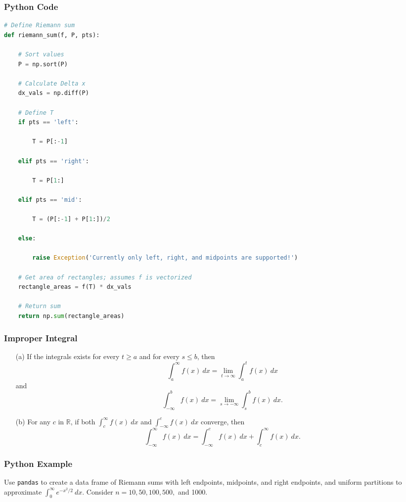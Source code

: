 \documentclass{beamer}
\begin{document}
\begin{frame}[fragile]
\frametitle{Python Code}

\begin{lstlisting}[language=Python]
# Define Riemann sum
def riemann_sum(f, P, pts):
    
    # Sort values
    P = np.sort(P)

    # Calculate Delta x
    dx_vals = np.diff(P) 

    # Define T
    if pts == 'left':

        T = P[:-1]

    elif pts == 'right':

        T = P[1:]

    elif pts == 'mid':
        
        T = (P[:-1] + P[1:])/2
        
    else:
        
        raise Exception('Currently only left, right, and midpoints are supported!')
        
    # Get area of rectangles; assumes f is vectorized
    rectangle_areas = f(T) * dx_vals
    
    # Return sum
    return np.sum(rectangle_areas)
\end{lstlisting}
\end{frame}

\begin{frame}
\frametitle{Improper Integral}
\begin{Definition}
{
\linespread{0.5}
\begin{enumerate}
\item[(a)] If the integrals exists for every $t \geq a$ and for every $s \leq b$, then
$$
\int_a^\infty f(x)\ dx = \lim_{t\to\infty}\int_a^t f(x)\ dx
$$
and
$$
\int_{-\infty}^b f(x)\ dx = \lim_{s\to-\infty}\int_s^b f(x)\ dx.
$$
\item[(b)] For any $c$ in $\mathbb{R}$, if both $\displaystyle\int_c^\infty f(x)\ dx$ and $\displaystyle\int_{-\infty}^c f(x)\ dx$ converge, then 
$$
\int_{-\infty}^\infty f(x)\ dx = \int_{-\infty}^c f(x)\ dx + \int_c^\infty f(x)\ dx.
$$
\end{enumerate}
}
\end{Definition}
\end{frame}

\begin{frame}[t]
\frametitle{Python Example}
\begin{Example}
Use \texttt{pandas} to create a data frame of Riemann sums with left endpoints, midpoints, and right endpoints, and uniform partitions to approximate $\displaystyle\int_0^\infty e^{-x^2/2}\ dx$. Consider $n = 10, 50, 100, 500,$ and 1000.
\end{Example}
\end{frame}
\end{document}
